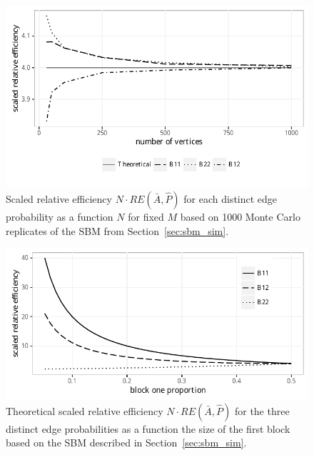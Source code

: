 \documentclass[a4paper]{article}
\begin{document}
\begin{figure}[!htb]
    \centering
    \includegraphics[width=1\textwidth]{RE.pdf}
    \caption{Scaled relative efficiency $N\cdot RE(\bar{A},\hat{P})$ for each distinct edge probability as a function $N$ for fixed $M$ based on 1000 Monte Carlo replicates of the SBM from Section~\ref{sec:sbm_sim}.}
    \label{fig:RE}
\end{figure}

\begin{figure}[!t]
\centering
\includegraphics[width=1\textwidth]{Rho.pdf}
\caption{Theoretical scaled relative efficiency $N\cdot RE(\bar{A},\hat{P})$ for the three distinct edge probabilities as a function the size of the first block based on the SBM described in Section~\ref{sec:sbm_sim}.
}
\label{fig:RErho}
\end{figure}
\end{document}
